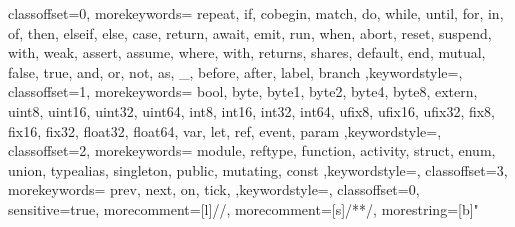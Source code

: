 \usepackage{amsmath,amssymb,amsfonts}
\usepackage{algorithmic}
\usepackage{graphicx}
\usepackage{textcomp}
\usepackage{xcolor}


\graphicspath{{images/}{graphics/}}
\usepackage{stfloats}
\usepackage{url}
\usepackage{color}


\usepackage{microtype}

\usepackage{caption}
\usepackage{subcaption}			%
\usepackage{ifthen}
\usepackage[smaller,nolist,nohyperlinks]{acronym}

\usepackage[group-separator=\text{\,},
            group-minimum-digits=4,
            detect-all,
            binary-units=true]{siunitx}

\usepackage{listings}

\usepackage{booktabs}

{
	classoffset=0,
	morekeywords={
		repeat, if, cobegin, match, do, while, until, for, in, of, then, elseif, else, case, return, await, emit, run, when, abort, reset, suspend, with, weak, assert, assume, where, with, returns, shares, default, end, mutual, false, true, and, or, not, as, _, before, after, label, branch
	},keywordstyle=\color[HTML]{0000FF},
	classoffset=1,
	morekeywords={
		bool, byte, byte1, byte2, byte4, byte8, extern, uint8, uint16, uint32, uint64, int8, int16, int32, int64, ufix8, ufix16, ufix32, fix8, fix16, fix32, float32, float64, var, let, ref, event, param
	},keywordstyle=\color[HTML]{0080C0},
	classoffset=2,
	morekeywords={
		module, reftype, function, activity, struct, enum, union, typealias, singleton, public, mutating, const
	},keywordstyle=\color[HTML]{0000FF},
	classoffset=3,
	morekeywords={
		prev, next, on, tick,
	},keywordstyle=\color[HTML]{DF0000},
	classoffset=0,
	sensitive=true, %
	morecomment=[l]{//}, %
	morecomment=[s]{/*}{*/}, %
	morestring=[b]" %
}


